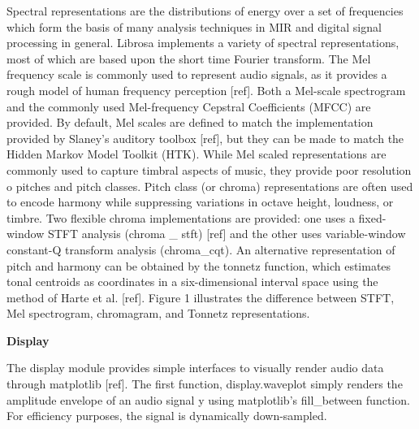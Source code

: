 Spectral representations are the distributions of energy over a set of frequencies which form the basis of many analysis techniques in MIR and digital signal processing in general. Librosa implements a variety of spectral representations, most of which are based upon the short \space time Fourier transform. The Mel frequency scale is commonly used to represent audio signals, as it provides a rough model of human frequency perception [ref]. Both a Mel-scale spectrogram and the commonly used Mel-frequency Cepstral Coefficients (MFCC) are provided. By default, Mel scales are defined to match the implementation provided by Slaney’s auditory toolbox [ref], but they can be made to match the Hidden Markov Model Toolkit (HTK). While Mel \space scaled representations are commonly used to capture timbral aspects of music, they provide poor resolution o pitches and pitch classes. Pitch class (or chroma) representations are often used to encode harmony while suppressing variations in octave height, loudness, or timbre. Two flexible chroma implementations are provided: one uses a fixed-window STFT analysis (chroma \_ stft) [ref] and the other uses variable-window constant-Q transform analysis (chroma\_cqt). An alternative representation of pitch and harmony can be obtained by the tonnetz function, which estimates tonal centroids as coordinates in a six-dimensional interval space using the method of Harte et \space al. [ref]. Figure 1 illustrates the difference between STFT, Mel spectrogram, chromagram, and Tonnetz representations.

\begin{flushleft}
  \textbf{Display}
\end{flushleft}

The display module provides simple interfaces to visually render audio data through matplotlib [ref]. The first function, display.waveplot simply renders the amplitude envelope of an audio signal y using matplotlib’s fill\_between function. For efficiency purposes, the signal is dynamically down-sampled. 
